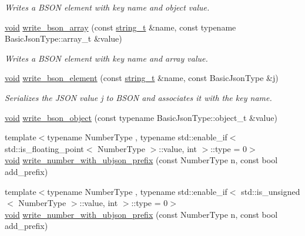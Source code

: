 \begin{DoxyCompactItemize}
\begin{DoxyCompactList}\small\item\em Writes a B\+S\+ON element with key {\itshape name} and object {\itshape value}. \end{DoxyCompactList}\item 
\hyperlink{namespacenlohmann_1_1detail_a59fca69799f6b9e366710cb9043aa77d}{void} \hyperlink{classnlohmann_1_1detail_1_1binary__writer_a025212bd170253638b9f05b3b6aa5bf9}{write\+\_\+bson\+\_\+array} (const \hyperlink{classnlohmann_1_1detail_1_1binary__writer_a29f2ae7a5c4a8c1dae47b3b2310de8a8}{string\+\_\+t} \&name, const typename Basic\+Json\+Type\+::array\+\_\+t \&value)
\begin{DoxyCompactList}\small\item\em Writes a B\+S\+ON element with key {\itshape name} and array {\itshape value}. \end{DoxyCompactList}\item 
\hyperlink{namespacenlohmann_1_1detail_a59fca69799f6b9e366710cb9043aa77d}{void} \hyperlink{classnlohmann_1_1detail_1_1binary__writer_a7ff58bf1a80018148bed860667ffca07}{write\+\_\+bson\+\_\+element} (const \hyperlink{classnlohmann_1_1detail_1_1binary__writer_a29f2ae7a5c4a8c1dae47b3b2310de8a8}{string\+\_\+t} \&name, const Basic\+Json\+Type \&j)
\begin{DoxyCompactList}\small\item\em Serializes the J\+S\+ON value {\itshape j} to B\+S\+ON and associates it with the key {\itshape name}. \end{DoxyCompactList}\item 
\hyperlink{namespacenlohmann_1_1detail_a59fca69799f6b9e366710cb9043aa77d}{void} \hyperlink{classnlohmann_1_1detail_1_1binary__writer_a29b3e0f83a8e5f2307804023109ba2c9}{write\+\_\+bson\+\_\+object} (const typename Basic\+Json\+Type\+::object\+\_\+t \&value)
\item 
{\footnotesize template$<$typename Number\+Type , typename std\+::enable\+\_\+if$<$ std\+::is\+\_\+floating\+\_\+point$<$ Number\+Type $>$\+::value, int $>$\+::type  = 0$>$ }\\\hyperlink{namespacenlohmann_1_1detail_a59fca69799f6b9e366710cb9043aa77d}{void} \hyperlink{classnlohmann_1_1detail_1_1binary__writer_a0ea6745f944c0c61672146886b4ee90f}{write\+\_\+number\+\_\+with\+\_\+ubjson\+\_\+prefix} (const Number\+Type n, const bool add\+\_\+prefix)
\item 
{\footnotesize template$<$typename Number\+Type , typename std\+::enable\+\_\+if$<$ std\+::is\+\_\+unsigned$<$ Number\+Type $>$\+::value, int $>$\+::type  = 0$>$ }\\\hyperlink{namespacenlohmann_1_1detail_a59fca69799f6b9e366710cb9043aa77d}{void} \hyperlink{classnlohmann_1_1detail_1_1binary__writer_a0ea6745f944c0c61672146886b4ee90f}{write\+\_\+number\+\_\+with\+\_\+ubjson\+\_\+prefix} (const Number\+Type n, const bool add\+\_\+prefix)

\end{DoxyCompactItemize}
